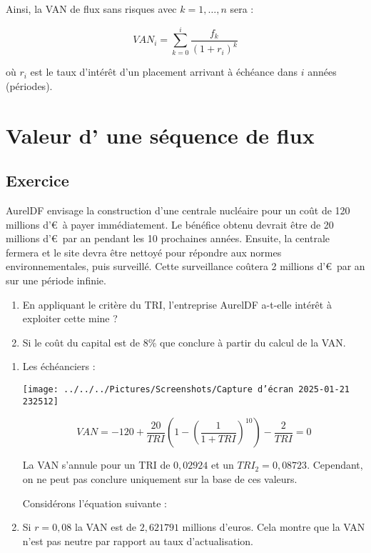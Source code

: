 \documentclass[a4paper, 12pt]{report}
\begin{document}
Ainsi, la VAN de flux sans risques avec \( k = 1, \ldots, n \) sera :

\[
VAN_i = \sum_{k=0}^{i} \frac{f_k}{(1 + r_i)^k}
\]

où \( r_i \) est le taux d'intérêt d'un placement arrivant à échéance dans \( i \) années (périodes).

\section{Valeur d' une séquence de flux}

\subsection{Exercice}

AurelDF envisage la construction d'une centrale nucléaire pour un coût de 120 millions d'\euro~à payer immédiatement. Le bénéfice obtenu devrait être de 20 millions d'\euro~par an pendant les 10 prochaines années. Ensuite, la centrale fermera et le site devra être nettoyé pour répondre aux normes environnementales, puis surveillé. Cette surveillance coûtera 2 millions d'\euro~par an sur une période infinie.

\begin{enumerate}
	\item En appliquant le critère du TRI, l'entreprise AurelDF a-t-elle intérêt à exploiter cette mine ?
	\item Si le coût du capital est de 8\% que conclure à partir du calcul de la VAN.
\end{enumerate} 

\begin{enumerate}
	\item Les échéanciers :
	
\begin{center}
\texttt{[image: ../../../Pictures/Screenshots/Capture d'écran 2025-01-21 232512]}
\end{center}\[
	VAN = -120 + \frac{20}{TRI} \left( 1 - \left( \frac{1}{1 + TRI} \right)^{10} \right) - \frac{2}{TRI} = 0
	\]
	
La VAN s'annule pour un TRI de \( 0,02924 \) et un \( TRI_2 = 0,08723 \). Cependant, on ne peut pas conclure uniquement sur la base de ces valeurs.
	
Considérons l'équation suivante :
\item Si \(  r = 0,08 \) la VAN est de \( 2,621791 \) millions d'euros. Cela montre que la VAN n'est pas neutre par rapport au taux d'actualisation.	
\end{enumerate}
\end{document}

